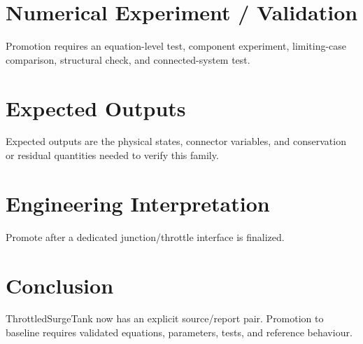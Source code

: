 \documentclass[10pt,a4paper]{article}
\begin{document}
\section{Numerical Experiment / Validation}Promotion requires an equation-level test, component experiment, limiting-case comparison, structural check, and connected-system test.
\section{Expected Outputs}Expected outputs are the physical states, connector variables, and conservation or residual quantities needed to verify this family.
\section{Engineering Interpretation}Promote after a dedicated junction/throttle interface is finalized.
\section*{Conclusion}ThrottledSurgeTank now has an explicit source/report pair. Promotion to baseline requires validated equations, parameters, tests, and reference behaviour.
\end{document}
